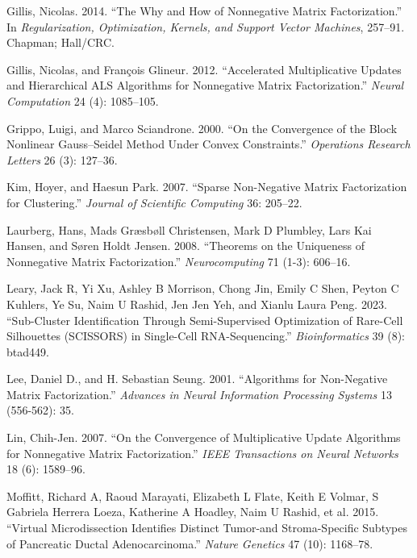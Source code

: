 \documentclass[
]{article}
\newlength{\cslhangindent}
\newenvironment{CSLReferences}[2] %
 {\begin{list}{}{%
  \setlength{\itemindent}{0pt}
  \setlength{\leftmargin}{0pt}
  \setlength{\parsep}{0pt}
  \ifodd #1
   \setlength{\leftmargin}{\cslhangindent}
   \setlength{\itemindent}{-1\cslhangindent}
  \fi
  \setlength{\itemsep}{#2\baselineskip}}}
 {\end{list}}
\begin{document}
\begin{CSLReferences}{1}{0}
Gillis, Nicolas. 2014. {``The Why and How of Nonnegative Matrix
Factorization.''} In \emph{Regularization, Optimization, Kernels, and
Support Vector Machines}, 257--91. Chapman; Hall/CRC.

Gillis, Nicolas, and François Glineur. 2012. {``Accelerated
Multiplicative Updates and Hierarchical ALS Algorithms for Nonnegative
Matrix Factorization.''} \emph{Neural Computation} 24 (4): 1085--105.

Grippo, Luigi, and Marco Sciandrone. 2000. {``On the Convergence of the
Block Nonlinear Gauss--Seidel Method Under Convex Constraints.''}
\emph{Operations Research Letters} 26 (3): 127--36.

Kim, Hoyer, and Haesun Park. 2007. {``Sparse Non-Negative Matrix
Factorization for Clustering.''} \emph{Journal of Scientific Computing}
36: 205--22.

Laurberg, Hans, Mads Græsbøll Christensen, Mark D Plumbley, Lars Kai
Hansen, and Søren Holdt Jensen. 2008. {``Theorems on the Uniqueness of
Nonnegative Matrix Factorization.''} \emph{Neurocomputing} 71 (1-3):
606--16.

Leary, Jack R, Yi Xu, Ashley B Morrison, Chong Jin, Emily C Shen, Peyton
C Kuhlers, Ye Su, Naim U Rashid, Jen Jen Yeh, and Xianlu Laura Peng.
2023. {``Sub-Cluster Identification Through Semi-Supervised Optimization
of Rare-Cell Silhouettes ({SCISSORS}) in Single-Cell
{RNA}-Sequencing.''} \emph{Bioinformatics} 39 (8): btad449.

Lee, Daniel D., and H. Sebastian Seung. 2001. {``Algorithms for
Non-Negative Matrix Factorization.''} \emph{Advances in Neural
Information Processing Systems} 13 (556-562): 35.

Lin, Chih-Jen. 2007. {``On the Convergence of Multiplicative Update
Algorithms for Nonnegative Matrix Factorization.''} \emph{IEEE
Transactions on Neural Networks} 18 (6): 1589--96.

Moffitt, Richard A, Raoud Marayati, Elizabeth L Flate, Keith E Volmar, S
Gabriela Herrera Loeza, Katherine A Hoadley, Naim U Rashid, et al. 2015.
{``Virtual Microdissection Identifies Distinct Tumor-and Stroma-Specific
Subtypes of Pancreatic Ductal Adenocarcinoma.''} \emph{Nature Genetics}
47 (10): 1168--78.


\end{CSLReferences}
\end{document}
